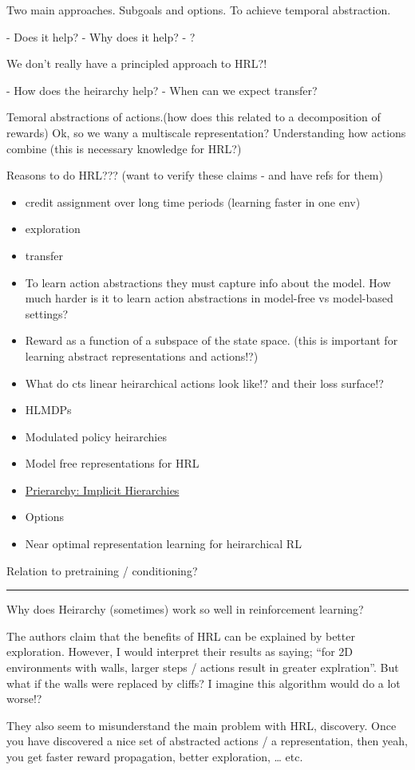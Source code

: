 Two main approaches. Subgoals and options. To achieve temporal abstraction.

- Does it help?
- Why does it help?
- ?

We don't really have a principled approach to HRL?!

- How does the heirarchy help?
- When can we expect transfer?


Temoral abstractions of actions.(how does this related to a
decomposition of rewards) Ok, so we wany a multiscale representation?
Understanding how actions combine (this is necessary knowledge for HRL?)

Reasons to do HRL??? (want to verify these claims - and have refs for
them)

\begin{itemize}
\item
  credit assignment over long time periods (learning faster in one env)
\item
  exploration
\item
  transfer
\item
  To learn action abstractions they must capture info about the model.
  How much harder is it to learn action abstractions in model-free vs
  model-based settings?
\item
  Reward as a function of a subspace of the state space. (this is
  important for learning abstract representations and actions!?)
\item
  What do cts linear heirarchical actions look like!? and their loss
  surface!?
\item
  HLMDPs \cite{Saxea}
\item
  Modulated policy heirarchies \cite{Pashevich}
\item
  Model free representations for HRL \cite{Rafati}
\item
  \href{https://blog.aqnichol.com/2019/04/03/prierarchy-implicit-hierarchies/}{Prierarchy:
  Implicit Hierarchies}
\item
  Options
\item
  Near optimal representation learning for heirarchical RL \cite{Nachum2018}
\end{itemize}

Relation to pretraining / conditioning?

\begin{center}\rule{0.5\linewidth}{\linethickness}\end{center}

Why does Heirarchy (sometimes) work so well in reinforcement learning?

The authors claim that the benefits of HRL can be explained by better
exploration. However, I would interpret their results as saying; ``for
2D environments with walls, larger steps / actions result in greater
explration''. But what if the walls were replaced by cliffs? I imagine
this algorithm would do a lot worse!?

They also seem to misunderstand the main problem with HRL, discovery.
Once you have discovered a nice set of abstracted actions / a
representation, then yeah, you get faster reward propagation, better
exploration, \ldots{} etc.

